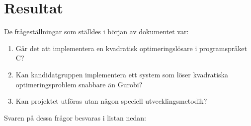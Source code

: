 \section{Resultat}

De frågeställningar som ställdes i början av dokumentet var:
\begin{enumerate}
\item Går det att implementera en kvadratisk optimeringslösare i programspråket C?
\item Kan kandidatgruppen implementera ett system som löser kvadratiska optimeringsproblem snabbare än Gurobi?
\item Kan projektet utföras utan någon speciell utvecklingsmetodik? 
\end{enumerate}

Svaren på dessa frågor besvaras i listan nedan:
